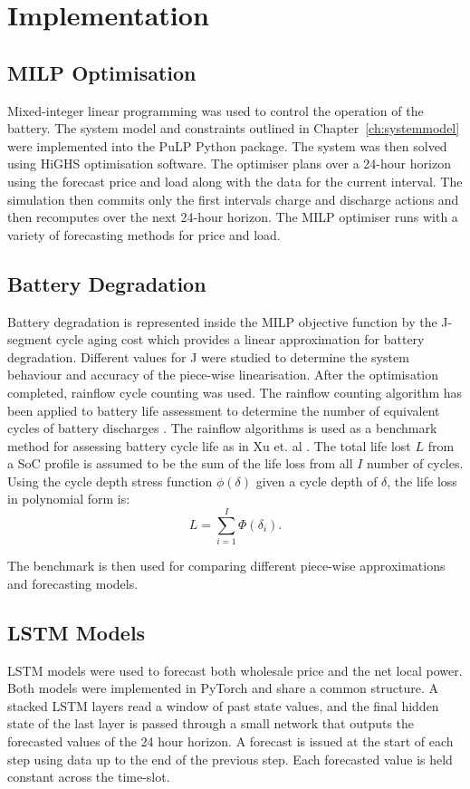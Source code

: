 \chapter{Implementation}

\section{MILP Optimisation}
Mixed-integer linear programming was used to control the operation of the battery. The system model and constraints outlined in Chapter~\ref{ch:systemmodel} were implemented into the PuLP Python package. The system was then solved using HiGHS optimisation software. The optimiser plans over a 24-hour horizon using the forecast price and load along with the data for the current interval. The simulation then commits only the first intervals charge and discharge actions and then recomputes over the next 24-hour horizon. The MILP optimiser runs with a variety of forecasting methods for price and load.


\section{Battery Degradation}
Battery degradation is represented inside the MILP objective function by the J-segment cycle aging cost which provides a linear approximation for battery degradation. Different values for J were studied to determine the system behaviour and accuracy of the piece-wise linearisation. After the optimisation completed, rainflow cycle counting was used. The rainflow counting algorithm has been applied to battery life assessment to determine the number of equivalent cycles of battery discharges \cite{xu_degradation} \cite{muenzel_cycle_life}. The rainflow algorithms is used as a benchmark method for assessing battery cycle life as in Xu et. al \cite{Xu2018}. The total life lost $L$ from a SoC profile is assumed to be the sum of the life loss from all $I$ number of cycles. Using the cycle depth stress function $\phi(\delta)$ given a cycle depth of $\delta$, the life loss in polynomial form is:
\begin{equation}
    L = \sum_{i=1}^{I} \Phi(\delta_i).
\end{equation}

The benchmark is then used for comparing different piece-wise approximations and forecasting models.


\section{LSTM Models}
LSTM models were used to forecast both wholesale price and the net local power. Both models were implemented in PyTorch and share a common structure. A stacked LSTM layers read a window of past state values, and the final hidden state of the last layer is passed through a small network that outputs the forecasted values of the 24 hour horizon. A forecast is issued at the start of each step using data up to the end of the previous step. Each forecasted value is held constant across the time-slot.

